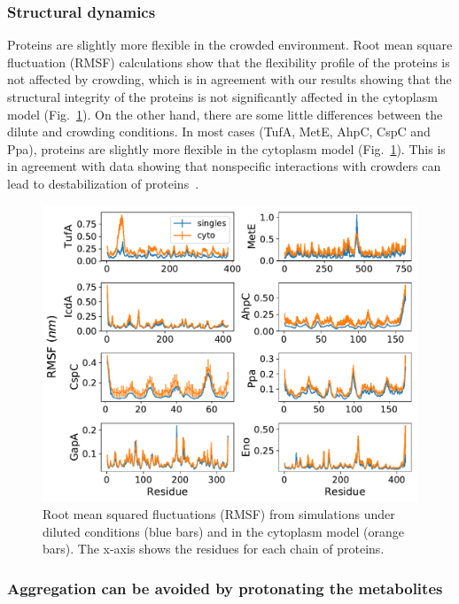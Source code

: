 \documentclass[journal=jacsat,manuscript=article]{achemso}
\begin{document}
\subsubsection{Structural dynamics}
Proteins are slightly more flexible in the crowded environment. Root mean square fluctuation (RMSF) calculations show that the flexibility profile of the proteins is not affected by crowding, which is in agreement with our results showing that the structural integrity of the proteins is not significantly affected in the cytoplasm model (Fig.~\ref{fig:rmsf}). On the other hand, there are some little differences between the dilute and crowding conditions. In most cases (TufA, MetE, AhpC, CspC and Ppa), proteins are slightly more flexible in the cytoplasm model (Fig.~\ref{fig:rmsf}). This is in agreement with data showing that nonspecific interactions with crowders can lead to destabilization of proteins~\cite{Feig2011, miklos2011, Wang2012b}.


\begin{figure}[H]
\includegraphics[scale=0.5]{rmsf.pdf}
\caption{Root mean squared fluctuations (RMSF) from simulations under diluted conditions (blue bars) and in the cytoplasm model (orange bars). The x-axis shows the residues for each chain of proteins.}
\label{fig:rmsf}
\end{figure}






\subsubsection{Aggregation can be avoided by protonating the metabolites}
\end{document}
